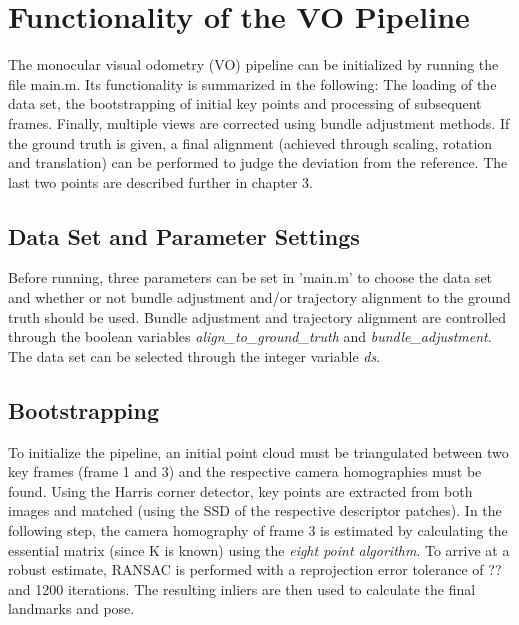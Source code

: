 \chapter{Functionality of the VO Pipeline}
The monocular visual odometry (VO) pipeline can be initialized by running the file main.m. Its functionality is summarized in the following: The loading of the data set, the bootstrapping of initial key points and processing of subsequent frames. Finally, multiple views are corrected using bundle adjustment methods. If the ground truth is given, a final alignment (achieved through scaling, rotation and translation) can be performed to judge the deviation from the reference. The last two points are described further in chapter 3.  

\section{Data Set and Parameter Settings}
Before running, three parameters can be set in 'main.m' to choose the data set and whether or not bundle adjustment and/or trajectory alignment to the ground truth should be used. Bundle adjustment and trajectory alignment are controlled through the boolean variables \emph{align\_to\_ground\_truth} and \emph{bundle\_adjustment}. The data set can be selected through the integer variable \emph{ds}.

\section{Bootstrapping}
To initialize the pipeline, an initial point cloud must be triangulated between two key frames (frame 1 and 3) and the respective camera homographies must be found. Using the Harris corner detector, key points are extracted from both images and matched (using the SSD of the respective descriptor patches). In the following step, the camera homography of frame 3 is estimated by calculating the essential matrix (since K is known) using the \emph{eight point algorithm}. To arrive at a robust estimate, RANSAC is performed with a reprojection error tolerance of ?? and 1200 iterations. The resulting inliers are then used to calculate the final landmarks and pose.      

